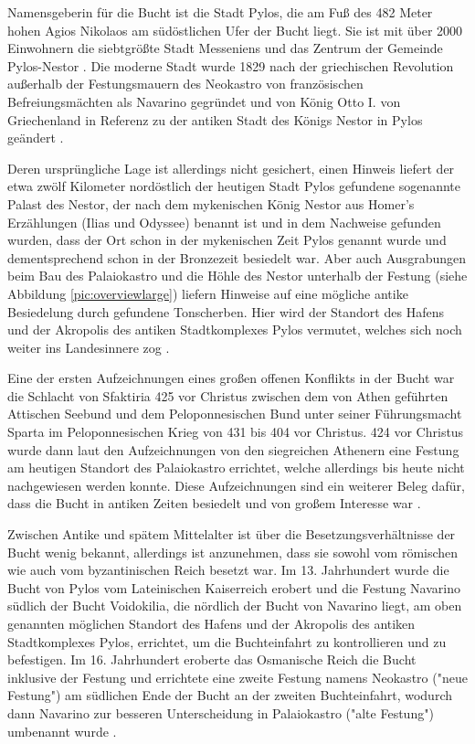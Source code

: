 \documentclass[preprint]{geomorphica} %
\begin{document}
Namensgeberin für die Bucht ist die Stadt Pylos, die am Fuß des 482 Meter hohen Agios Nikolaos am südöstlichen Ufer der Bucht liegt.
Sie ist mit über 2000 Einwohnern die siebtgrößte Stadt Messeniens und das Zentrum der Gemeinde Pylos-Nestor \cite{ELSTAT2019}.
Die moderne Stadt wurde 1829 nach der griechischen Revolution außerhalb der Festungsmauern des Neokastro von französischen Befreiungsmächten als Navarino gegründet und von König Otto I. von Griechenland in Referenz zu der antiken Stadt des Königs Nestor in Pylos geändert \cite{Davis2008}.

Deren ursprüngliche Lage ist allerdings nicht gesichert, einen Hinweis liefert der etwa zwölf Kilometer nordöstlich der heutigen Stadt Pylos gefundene sogenannte Palast des Nestor, der nach dem mykenischen König Nestor aus Homer's Erzählungen (Ilias und Odyssee) benannt ist und in dem Nachweise gefunden wurden, dass der Ort schon in der mykenischen Zeit Pylos genannt wurde und dementsprechend schon in der Bronzezeit besiedelt war.
Aber auch Ausgrabungen beim Bau des Palaiokastro und die Höhle des Nestor unterhalb der Festung (siehe Abbildung \ref{pic:overviewlarge}) liefern Hinweise auf eine mögliche antike Besiedelung durch gefundene Tonscherben.
Hier wird der Standort des Hafens und der Akropolis des antiken Stadtkomplexes Pylos vermutet, welches sich noch weiter ins Landesinnere zog \cite{Davis2008, SmithFelton1855}.

Eine der ersten Aufzeichnungen eines großen offenen Konflikts in der Bucht war die Schlacht von Sfaktiria 425 vor Christus zwischen dem von Athen geführten Attischen Seebund und dem Peloponnesischen Bund unter seiner Führungsmacht Sparta im Peloponnesischen Krieg von 431 bis 404 vor Christus.
424 vor Christus wurde dann laut den Aufzeichnungen von den siegreichen Athenern eine Festung am heutigen Standort des Palaiokastro errichtet, welche allerdings bis heute nicht nachgewiesen werden konnte.
Diese Aufzeichnungen sind ein weiterer Beleg dafür, dass die Bucht in antiken Zeiten besiedelt und von großem Interesse war \cite{Davis2008, SmithFelton1855, Pausanias2020}.

Zwischen Antike und spätem Mittelalter ist über die Besetzungsverhältnisse der Bucht wenig bekannt, allerdings ist anzunehmen, dass sie sowohl vom römischen wie auch vom byzantinischen Reich besetzt war.
Im 13. Jahrhundert wurde die Bucht von Pylos vom Lateinischen Kaiserreich erobert und die Festung Navarino südlich der Bucht Voidokilia, die nördlich der Bucht von Navarino liegt, am oben genannten möglichen Standort des Hafens und der Akropolis des antiken Stadtkomplexes Pylos, errichtet, um die Buchteinfahrt zu kontrollieren und zu befestigen.
Im 16. Jahrhundert eroberte das Osmanische Reich die Bucht inklusive der Festung und errichtete eine zweite Festung namens Neokastro ("neue Festung") am südlichen Ende der Bucht an der zweiten Buchteinfahrt, wodurch dann Navarino zur besseren Unterscheidung in Palaiokastro ("alte Festung") umbenannt wurde \cite{Davis2008, Bon1969, SmithFelton1855}.
\end{document}
